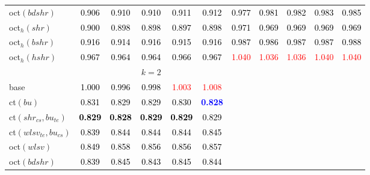 \begin{tabular}[t]{l|>{}cccc>{}c|ccccc}
oct$(bdshr)$ & \textcolor{black}{0.906} & \textcolor{black}{0.910} & \textcolor{black}{0.910} & \textcolor{black}{0.911} & \textcolor{black}{0.912} & \textcolor{black}{0.977} & \textcolor{black}{0.981} & \textcolor{black}{0.982} & \textcolor{black}{0.983} & \textcolor{black}{0.985}\\
oct$_h(shr)$ & \textcolor{black}{0.900} & \textcolor{black}{0.898} & \textcolor{black}{0.898} & \textcolor{black}{0.897} & \textcolor{black}{0.898} & \textcolor{black}{0.971} & \textcolor{black}{0.969} & \textcolor{black}{0.969} & \textcolor{black}{0.969} & \textcolor{black}{0.969}\\
oct$_h(bshr)$ & \textcolor{black}{0.916} & \textcolor{black}{0.914} & \textcolor{black}{0.916} & \textcolor{black}{0.915} & \textcolor{black}{0.916} & \textcolor{black}{0.987} & \textcolor{black}{0.986} & \textcolor{black}{0.987} & \textcolor{black}{0.987} & \textcolor{black}{0.988}\\
oct$_h(hshr)$ & \textcolor{black}{0.967} & \textcolor{black}{0.964} & \textcolor{black}{0.964} & \textcolor{black}{0.966} & \textcolor{black}{0.967} & \textcolor{red}{1.040} & \textcolor{red}{1.036} & \textcolor{red}{1.036} & \textcolor{red}{1.040} & \textcolor{red}{1.040}\\
\addlinespace[0.3em]
\multicolumn{1}{c}{} & \multicolumn{5}{c}{\textbf{$k = 2$}} & \multicolumn{5}{c}{}\\
base & \textcolor{black}{1.000} & \textcolor{black}{0.996} & \textcolor{black}{0.998} & \textcolor{red}{1.003} & \textcolor{red}{1.008} &  &  &  &  & \\
ct$(bu)$ & \textcolor{black}{0.831} & \textcolor{black}{0.829} & \textcolor{black}{0.829} & \textcolor{black}{0.830} & \textcolor{blue}{\textbf{0.828}} &  &  &  &  & \\
ct$(shr_{cs}, bu_{te})$ & \textcolor{black}{\textbf{0.829}} & \textcolor{black}{\textbf{0.828}} & \textcolor{black}{\textbf{0.829}} & \textcolor{black}{\textbf{0.829}} & \textcolor{black}{0.829} &  &  &  &  & \\
ct$(wlsv_{te}, bu_{cs})$ & \textcolor{black}{0.839} & \textcolor{black}{0.844} & \textcolor{black}{0.844} & \textcolor{black}{0.844} & \textcolor{black}{0.845} &  &  &  &  & \\
oct$(wlsv)$ & \textcolor{black}{0.849} & \textcolor{black}{0.858} & \textcolor{black}{0.856} & \textcolor{black}{0.856} & \textcolor{black}{0.857} &  &  &  &  & \\
oct$(bdshr)$ & \textcolor{black}{0.839} & \textcolor{black}{0.845} & \textcolor{black}{0.843} & \textcolor{black}{0.845} & \textcolor{black}{0.844} &  &  &  &  & \\

\end{tabular}
